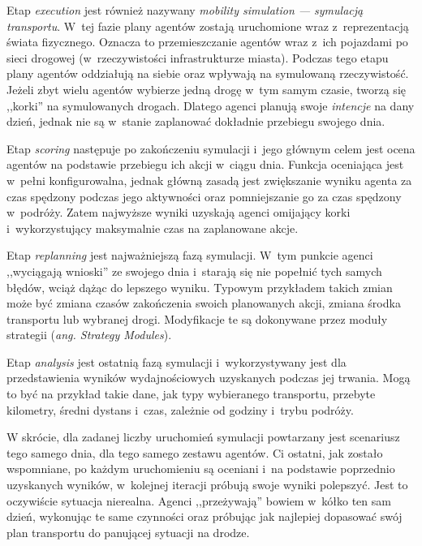 \documentclass[twoside,12pt]{report}
\begin{document}
Etap \textit{execution} jest również nazywany \textit{mobility simulation --- symulacją transportu}. W~tej fazie plany agentów zostają uruchomione wraz z~reprezentacją świata fizycznego. Oznacza to przemieszczanie agentów wraz z~ich pojazdami po sieci drogowej (w~rzeczywistości infrastrukturze miasta). Podczas tego etapu plany agentów oddziałują na siebie oraz wpływają na symulowaną rzeczywistość. Jeżeli zbyt wielu agentów wybierze jedną drogę w~tym samym czasie, tworzą się ,,korki'' na symulowanych drogach. Dlatego agenci planują swoje \textit{intencje} na dany dzień, jednak nie są w~stanie zaplanować dokładnie przebiegu swojego dnia.

Etap \textit{scoring} następuje po zakończeniu symulacji i~jego głównym celem jest ocena agentów na podstawie przebiegu ich akcji w~ciągu dnia. Funkcja oceniająca jest w~pełni konfigurowalna, jednak główną zasadą jest zwiększanie wyniku agenta  za czas spędzony podczas jego aktywności oraz pomniejszanie go za czas spędzony w~podróży. Zatem najwyższe wyniki uzyskają agenci omijający korki i~wykorzystujący maksymalnie czas na zaplanowane akcje.

Etap \textit{replanning} jest najważniejszą fazą symulacji. W~tym punkcie agenci ,,wyciągają wnioski'' ze swojego dnia i~starają się nie popełnić tych samych błędów, wciąż dążąc do lepszego wyniku. Typowym przykładem takich zmian może być zmiana czasów zakończenia swoich planowanych akcji, zmiana środka transportu lub wybranej drogi. Modyfikacje te są dokonywane przez moduły strategii (\textit{ang. Strategy Modules}).

Etap \textit{analysis} jest ostatnią fazą symulacji i~wykorzystywany jest dla przedstawienia wyników wydajnościowych uzyskanych podczas jej trwania. Mogą to być na przykład takie dane, jak typy wybieranego transportu, przebyte kilometry, średni dystans i~czas, zależnie od godziny i~trybu podróży. 

W skrócie, dla zadanej liczby uruchomień symulacji powtarzany jest scenariusz tego samego dnia, dla tego samego zestawu agentów. Ci ostatni, jak zostało wspomniane, po każdym uruchomieniu są oceniani i~na podstawie poprzednio uzyskanych wyników, w~kolejnej iteracji próbują swoje wyniki polepszyć. Jest to oczywiście sytuacja nierealna. Agenci ,,przeżywają'' bowiem w~kółko ten sam dzień, wykonując te same czynności oraz próbując jak najlepiej dopasować swój plan transportu do panującej sytuacji na drodze.
\end{document}
